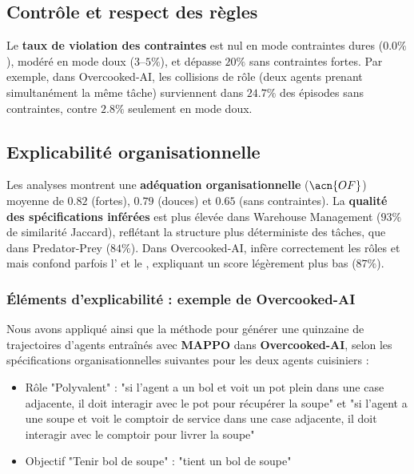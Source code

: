 \subsection*{Contrôle et respect des règles}

Le \textbf{taux de violation des contraintes} est nul en mode contraintes dures ($0.0\%$), modéré en mode doux ($3$–$5\%$), et dépasse $20\%$ sans contraintes fortes.
Par exemple, dans Overcooked-AI, les collisions de rôle (deux agents prenant simultanément la même tâche) surviennent dans $24.7\%$ des épisodes sans contraintes, contre $2.8\%$ seulement en mode doux.

\subsection*{Explicabilité organisationnelle}

Les analyses  montrent une \textbf{adéquation organisationnelle} ($\acn{OF}$) moyenne de $0.82$ (fortes), $0.79$ (douces) et $0.65$ (sans contraintes).
La \textbf{qualité des spécifications inférées} est plus élevée dans Warehouse Management ($93\%$ de similarité Jaccard), reflétant la structure plus déterministe des tâches, que dans Predator-Prey ($84\%$).
Dans Overcooked-AI,  infère correctement les rôles  et  mais confond parfois l' et le , expliquant un score légèrement plus bas ($87\%$).


\subsubsection*{Éléments d'explicabilité : exemple de Overcooked-AI}

Nous avons appliqué  ainsi que la méthode  pour générer une quinzaine de trajectoires d'agents entraînés avec \textbf{MAPPO} dans \textbf{Overcooked-AI}, selon les spécifications organisationnelles suivantes pour les deux agents cuisiniers :
%
\begin{itemize}
  \item Rôle "Polyvalent" : "si l'agent a un bol et voit un pot plein dans une case adjacente, il doit interagir avec le pot pour récupérer la soupe" et "si l'agent a une soupe et voit le comptoir de service dans une case adjacente, il doit interagir avec le comptoir pour livrer la soupe"
  \item Objectif "Tenir bol de soupe" : "tient un bol de soupe"
\end{itemize}

